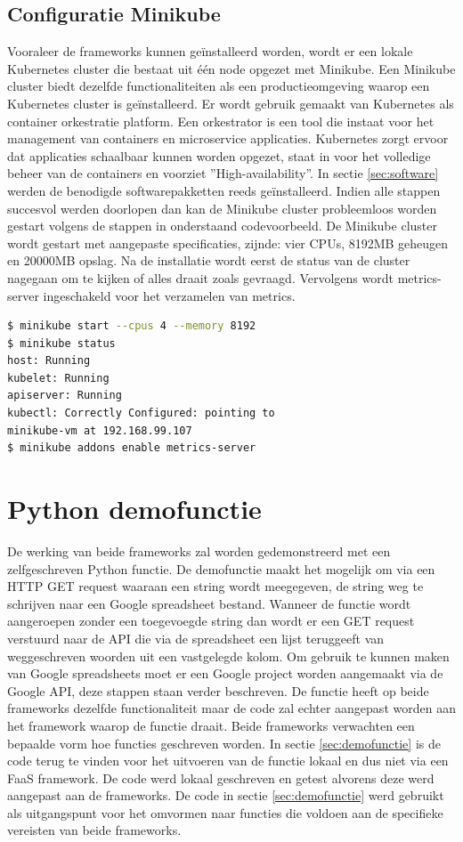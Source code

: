 \subsection{Configuratie Minikube}
\label{sec:configuratie-minikube}
Vooraleer de frameworks kunnen geïnstalleerd worden, wordt er een lokale Kubernetes cluster die bestaat uit één node opgezet met Minikube. Een Minikube cluster biedt dezelfde functionaliteiten als een productieomgeving waarop een Kubernetes cluster is geïnstalleerd. Er wordt gebruik gemaakt van Kubernetes als container orkestratie platform. Een orkestrator is een tool die instaat voor het management van containers en microservice applicaties. Kubernetes zorgt ervoor dat applicaties schaalbaar kunnen worden opgezet, staat in voor het volledige beheer van de containers en voorziet ''High-availability''.
In sectie \ref{sec:software} werden de benodigde softwarepakketten reeds geïnstalleerd. Indien alle stappen succesvol werden doorlopen dan kan de Minikube cluster probleemloos worden gestart volgens de stappen in onderstaand codevoorbeeld. De Minikube cluster wordt gestart met aangepaste specificaties, zijnde: vier CPUs, 8192MB geheugen en 20000MB opslag. Na de installatie wordt eerst de status van de cluster nagegaan om te kijken of alles draait zoals gevraagd. Vervolgens wordt metrics-server ingeschakeld voor het verzamelen van metrics.

\begin{lstlisting}[language=bash]
$ minikube start --cpus 4 --memory 8192
$ minikube status
host: Running
kubelet: Running
apiserver: Running
kubectl: Correctly Configured: pointing to
minikube-vm at 192.168.99.107
$ minikube addons enable metrics-server
\end{lstlisting}

\section{Python demofunctie}
\label{sec:python-demofunctie}
De werking van beide frameworks zal worden gedemonstreerd met een zelfgeschreven Python functie. De demofunctie maakt het mogelijk om via een HTTP GET request waaraan een string wordt meegegeven, de string weg te schrijven naar een Google spreadsheet bestand. Wanneer de functie wordt aangeroepen zonder een toegevoegde string dan wordt er een GET request verstuurd naar de API die via de spreadsheet een lijst teruggeeft van weggeschreven woorden uit een vastgelegde kolom. Om gebruik te kunnen maken van Google spreadsheets moet er een Google project worden aangemaakt via de Google API, deze stappen staan verder beschreven. De functie heeft op beide frameworks dezelfde functionaliteit maar de code zal echter aangepast worden aan het framework waarop de functie draait. Beide frameworks verwachten een bepaalde vorm hoe functies geschreven worden. In sectie \ref{sec:demofunctie} is de code terug te vinden voor het uitvoeren van de functie lokaal en dus niet via een FaaS framework. De code werd lokaal geschreven en getest alvorens deze werd aangepast aan de frameworks. De code in sectie \ref{sec:demofunctie} werd gebruikt als uitgangspunt voor het omvormen naar functies die voldoen aan de specifieke vereisten van beide frameworks.


